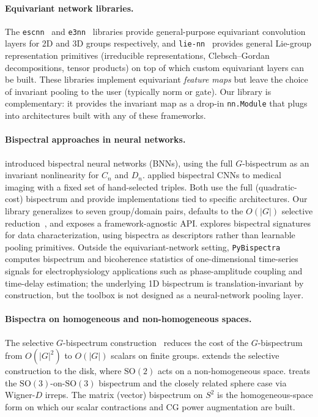 \documentclass{article}
\theoremstyle{definition}
\theoremstyle{remark}
\newcommand{\SO}{\mathrm{SO}}
\theoremstyle{definition}
\begin{document}
\paragraph{Equivariant network libraries.}
The \texttt{escnn}~\citep{cesa2022program} and \texttt{e3nn}~\citep{geiger2022e3nn}
libraries provide general-purpose equivariant convolution layers for 2D and 3D
groups respectively, and \texttt{lie-nn}~\citep{batatia2023general}
provides general Lie-group representation primitives (irreducible
representations, Clebsch--Gordan decompositions, tensor products) on
top of which custom equivariant layers can be built. These libraries
implement equivariant \emph{feature maps} but leave the choice of
invariant pooling to the user (typically norm or gate). Our library is
complementary: it provides the invariant map as a drop-in
\texttt{nn.Module} that plugs into architectures built with any of these
frameworks.

\paragraph{Bispectral approaches in neural networks.}
\citet{sanborn2023bispectral} introduced bispectral neural networks (BNNs),
using the full $G$-bispectrum as an invariant nonlinearity for $C_n$ and $D_n$.
\citet{oreiller2022bispectral} applied bispectral CNNs to medical imaging
with a fixed set of hand-selected triples. Both use the full (quadratic-cost)
bispectrum and provide implementations tied to specific architectures.
Our library generalizes to seven group/domain pairs, defaults to the
$O(|G|)$ selective reduction~\citep{mataigne2024selective}, and exposes
a framework-agnostic API.
\citet{chevalley2024bispectral} explores bispectral signatures for data
characterization, using bispectra as descriptors rather than learnable
pooling primitives.
Outside the equivariant-network setting,
\texttt{PyBispectra}~\citep{binns2025pybispectra} computes bispectrum
and bicoherence statistics of one-dimensional time-series signals for
electrophysiology applications such as phase-amplitude coupling and
time-delay estimation; the underlying 1D bispectrum is translation-invariant
by construction, but the toolbox is not designed as a neural-network
pooling layer.

\paragraph{Bispectra on homogeneous and non-homogeneous spaces.}
The selective $G$-bispectrum
construction~\citep{mataigne2024selective} reduces the cost of the
$G$-bispectrum from $O(|G|^2)$ to $O(|G|)$ scalars on finite groups.
\citet{myers2025selective} extends the selective construction to the
disk, where $\SO(2)$ acts on a non-homogeneous space.
\citet{kakarala2012bispectrum} treats the $\SO(3)$-on-$\SO(3)$
bispectrum and the closely related sphere case via Wigner-$D$ irreps.
The matrix (vector) bispectrum on $S^2$ is the homogeneous-space form
on which our scalar contractions and CG power augmentation are built.
\end{document}

